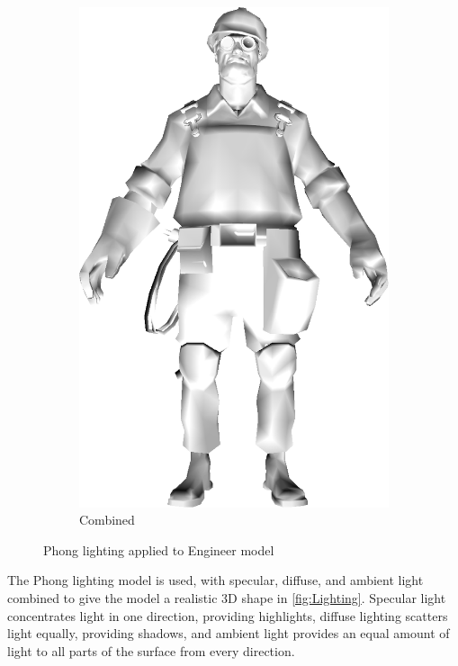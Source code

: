 \begin{figure}[h]
\begin{subfigure}[b]{0.16\textwidth}
        \includegraphics[width=\textwidth]{img/Lighting/combined.png}
        \caption{Combined}
        \label{fig:combined}
    \end{subfigure}
    \caption{Phong lighting applied to Engineer model}
    \label{fig:Lighting}
\end{figure}

The Phong lighting model is used, with specular, diffuse, and ambient light combined to give 
the model a realistic 3D shape in \autoref{fig:Lighting}. Specular light concentrates light in one direction, providing 
highlights, diffuse lighting scatters light equally, providing shadows, and ambient light provides 
an equal amount of light to all parts of the surface from every direction. 

